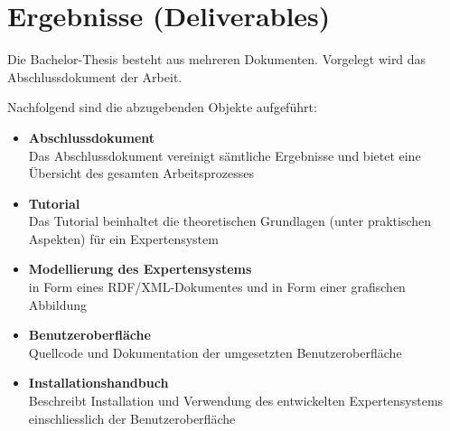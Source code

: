 \section{Ergebnisse (Deliverables)}
\label{sec:admin_ergebniss}
Die Bachelor-Thesis besteht aus mehreren Dokumenten. Vorgelegt wird das Abschlussdokument der Arbeit.

Nachfolgend sind die abzugebenden Objekte aufgeführt:
\begin{itemize}
	\item \textbf{Abschlussdokument} \\
        Das Abschlussdokument vereinigt sämtliche Ergebnisse und bietet eine Übersicht des gesamten Arbeitsprozesses
	\item \textbf{Tutorial} \\
        Das Tutorial beinhaltet die theoretischen Grundlagen (unter praktischen Aspekten) für ein Expertensystem
	\item \textbf{Modellierung des Expertensystems} \\
        in Form eines RDF/XML-Dokumentes und in Form einer grafischen Abbildung
	\item \textbf{Benutzeroberfläche} \\
        Quellcode und Dokumentation der umgesetzten Benutzeroberfläche
	\item \textbf{Installationshandbuch} \\
        Beschreibt Installation und Verwendung des entwickelten Expertensystems einschliesslich der Benutzeroberfläche
\end{itemize}
